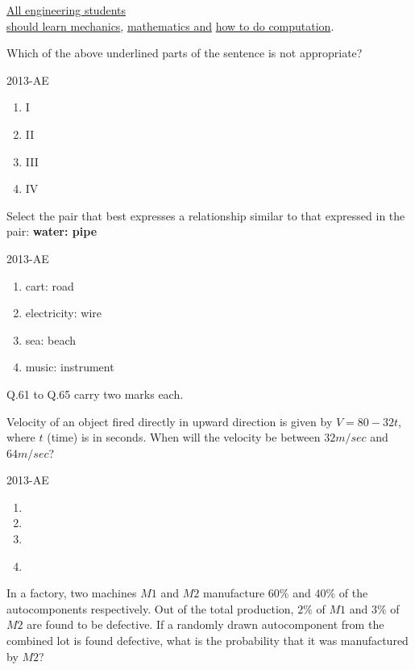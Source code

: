 \item \underline{All engineering students} \\ \underline{should learn mechanics}, \underline{mathematics and}  \underline{how to do computation}.

Which of the above underlined parts of the sentence is not appropriate?

\hfill{2013-AE}

\begin{enumerate}
    \item I
    \item II
    \item III
    \item IV\\
\end{enumerate}

\item Select the pair that best expresses a relationship similar to that expressed in the pair: \textbf{water: pipe}

\hfill{2013-AE}

\begin{enumerate}
    \item cart: road
    \item electricity: wire
    \item sea: beach
    \item music: instrument\\
\end{enumerate}

Q.61 to Q.65 carry two marks each.\\

\item Velocity of an object fired directly in upward direction is given by $V = 80 - 32t$, where $t$ (time) is in seconds. When will the velocity be between $32 m/sec$ and $64 m/sec$?

\hfill{2013-AE}

\begin{enumerate}
    \item {}
    \item {}
    \item {}
    \item {}\\
\end{enumerate}

\item In a factory, two machines $M1$ and $M2$ manufacture $60\%$ and $40\%$ of the autocomponents respectively. Out of the total production, $2\%$ of $M1$ and $3\%$ of $M2$ are found to be defective. If a randomly drawn autocomponent from the combined lot is found defective, what is the probability that it was manufactured by $M2$?

